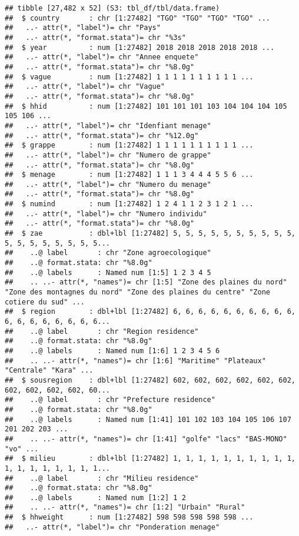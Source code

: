 \documentclass[
]{article}
\begin{document}
\begin{verbatim}
## tibble [27,482 x 52] (S3: tbl_df/tbl/data.frame)
##  $ country       : chr [1:27482] "TGO" "TGO" "TGO" "TGO" ...
##   ..- attr(*, "label")= chr "Pays"
##   ..- attr(*, "format.stata")= chr "%3s"
##  $ year          : num [1:27482] 2018 2018 2018 2018 2018 ...
##   ..- attr(*, "label")= chr "Annee enquete"
##   ..- attr(*, "format.stata")= chr "%8.0g"
##  $ vague         : num [1:27482] 1 1 1 1 1 1 1 1 1 1 ...
##   ..- attr(*, "label")= chr "Vague"
##   ..- attr(*, "format.stata")= chr "%8.0g"
##  $ hhid          : num [1:27482] 101 101 101 103 104 104 104 105 105 106 ...
##   ..- attr(*, "label")= chr "Idenfiant menage"
##   ..- attr(*, "format.stata")= chr "%12.0g"
##  $ grappe        : num [1:27482] 1 1 1 1 1 1 1 1 1 1 ...
##   ..- attr(*, "label")= chr "Numero de grappe"
##   ..- attr(*, "format.stata")= chr "%8.0g"
##  $ menage        : num [1:27482] 1 1 1 3 4 4 4 5 5 6 ...
##   ..- attr(*, "label")= chr "Numero du menage"
##   ..- attr(*, "format.stata")= chr "%8.0g"
##  $ numind        : num [1:27482] 1 2 4 1 1 2 3 1 2 1 ...
##   ..- attr(*, "label")= chr "Numero individu"
##   ..- attr(*, "format.stata")= chr "%8.0g"
##  $ zae           : dbl+lbl [1:27482] 5, 5, 5, 5, 5, 5, 5, 5, 5, 5, 5, 5, 5, 5, 5, 5, 5, 5...
##    ..@ label       : chr "Zone agroecologique"
##    ..@ format.stata: chr "%8.0g"
##    ..@ labels      : Named num [1:5] 1 2 3 4 5
##    .. ..- attr(*, "names")= chr [1:5] "Zone des plaines du nord" "Zone des montagnes du nord" "Zone des plaines du centre" "Zone cotiere du sud" ...
##  $ region        : dbl+lbl [1:27482] 6, 6, 6, 6, 6, 6, 6, 6, 6, 6, 6, 6, 6, 6, 6, 6, 6, 6...
##    ..@ label       : chr "Region residence"
##    ..@ format.stata: chr "%8.0g"
##    ..@ labels      : Named num [1:6] 1 2 3 4 5 6
##    .. ..- attr(*, "names")= chr [1:6] "Maritime" "Plateaux" "Centrale" "Kara" ...
##  $ sousregion    : dbl+lbl [1:27482] 602, 602, 602, 602, 602, 602, 602, 602, 602, 602, 60...
##    ..@ label       : chr "Prefecture residence"
##    ..@ format.stata: chr "%8.0g"
##    ..@ labels      : Named num [1:41] 101 102 103 104 105 106 107 201 202 203 ...
##    .. ..- attr(*, "names")= chr [1:41] "golfe" "lacs" "BAS-MONO" "vo" ...
##  $ milieu        : dbl+lbl [1:27482] 1, 1, 1, 1, 1, 1, 1, 1, 1, 1, 1, 1, 1, 1, 1, 1, 1, 1...
##    ..@ label       : chr "Milieu residence"
##    ..@ format.stata: chr "%8.0g"
##    ..@ labels      : Named num [1:2] 1 2
##    .. ..- attr(*, "names")= chr [1:2] "Urbain" "Rural"
##  $ hhweight      : num [1:27482] 598 598 598 598 598 ...
##   ..- attr(*, "label")= chr "Ponderation menage"

\end{verbatim}
\end{document}
